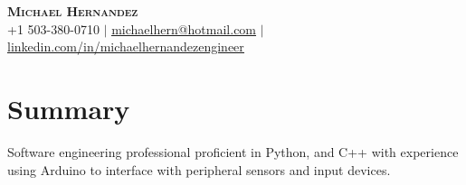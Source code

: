 \documentclass[a4paper,11pt]{article}
\begin{document}

\begin{center}
    \textbf{\Huge \scshape Michael Hernandez} \\ \vspace{1pt}
    \small +1 503-380-0710 $|$ \href{mailto:michaelhern@hotmail.com}{\underline{michaelhern@hotmail.com}} $|$ 
    \href{https://linkedin.com/in/michaelhernandezengineer}{\underline{linkedin.com/in/michaelhernandezengineer}} %
\end{center}

\section{Summary}
\begin{itemize}[leftmargin=0.15in, label={}]
	\small{\item{Software engineering professional proficient in Python, and C++ with experience using Arduino to interface with peripheral sensors and input devices.}}
\end{itemize}

%
\end{document}
